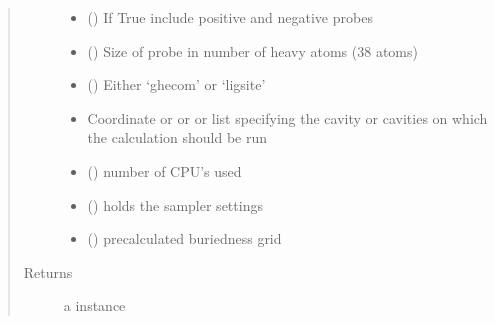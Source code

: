 \documentclass[letterpaper,10pt,english]{sphinxmanual}
\begin{document}
\begin{fulllineitems}
\begin{fulllineitems}
\begin{quote}
\begin{description}
\begin{itemize}
\item {} 
 () \textendash{} If True include positive and negative probes

\item {} 
 () \textendash{} Size of probe in number of heavy atoms (3\sphinxhyphen{}8 atoms)

\item {} 
 () \textendash{} Either ‘ghecom’ or ‘ligsite’

\item {} 
 \textendash{} Coordinate or  or  or list specifying the cavity or cavities on which the calculation should be run

\item {} 
 () \textendash{} number of CPU’s used

\item {} 
 ({\hyperref[\detokenize{calculation_api:hotspots.calculation.Runner.Settings}]{}}) \textendash{} holds the sampler settings

\item {} 
 () \textendash{} pre\sphinxhyphen{}calculated buriedness grid

\end{itemize}

\item[{Returns}] \leavevmode
a {\hyperref[\detokenize{result_api:hotspots.result.Results}]{}} instance

\end{description}\end{quote}

\begin{sphinxVerbatim}[commandchars=\\\{\}]
   
   
\end{sphinxVerbatim}


\end{fulllineitems}
\end{fulllineitems}
\end{document}
